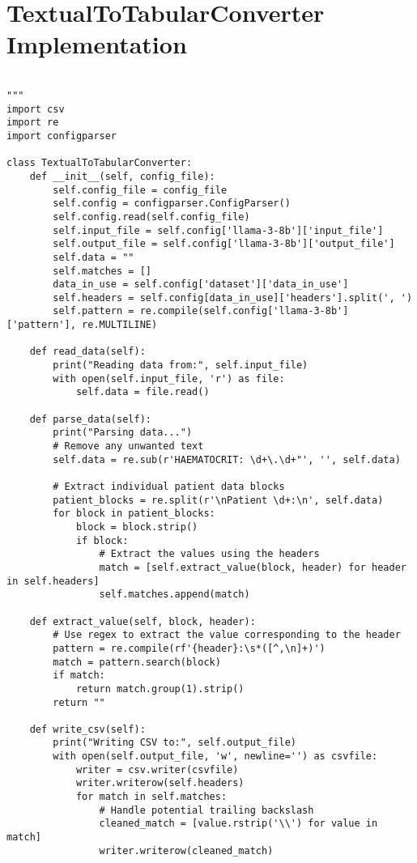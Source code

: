 \chapter*{TextualToTabularConverter Implementation}
\label{app:textTotab_appendix}

\begin{verbatim}

"""
import csv
import re
import configparser

class TextualToTabularConverter:
    def __init__(self, config_file):
        self.config_file = config_file
        self.config = configparser.ConfigParser()
        self.config.read(self.config_file)
        self.input_file = self.config['llama-3-8b']['input_file']
        self.output_file = self.config['llama-3-8b']['output_file']
        self.data = ""
        self.matches = []
        data_in_use = self.config['dataset']['data_in_use']
        self.headers = self.config[data_in_use]['headers'].split(', ')
        self.pattern = re.compile(self.config['llama-3-8b']['pattern'], re.MULTILINE)

    def read_data(self):
        print("Reading data from:", self.input_file)
        with open(self.input_file, 'r') as file:
            self.data = file.read()

    def parse_data(self):
        print("Parsing data...")
        # Remove any unwanted text
        self.data = re.sub(r'HAEMATOCRIT: \d+\.\d+"', '', self.data)
        
        # Extract individual patient data blocks
        patient_blocks = re.split(r'\nPatient \d+:\n', self.data)
        for block in patient_blocks:
            block = block.strip()
            if block:
                # Extract the values using the headers
                match = [self.extract_value(block, header) for header in self.headers]
                self.matches.append(match)

    def extract_value(self, block, header):
        # Use regex to extract the value corresponding to the header
        pattern = re.compile(rf'{header}:\s*([^,\n]+)')
        match = pattern.search(block)
        if match:
            return match.group(1).strip()
        return ""

    def write_csv(self):
        print("Writing CSV to:", self.output_file)
        with open(self.output_file, 'w', newline='') as csvfile:
            writer = csv.writer(csvfile)
            writer.writerow(self.headers)
            for match in self.matches:
                # Handle potential trailing backslash
                cleaned_match = [value.rstrip('\\') for value in match]
                writer.writerow(cleaned_match)


\end{verbatim}
